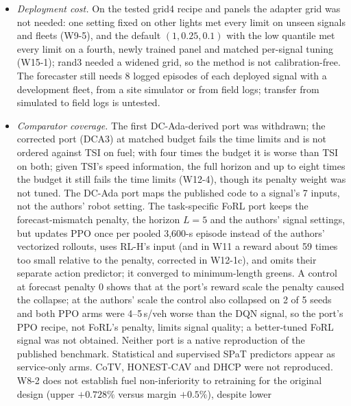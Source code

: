 \begin{itemize}
R15-U lowers it to $-0.09$ (upper $+0.09$) on the same signals and fleets. Field data weigh these dependences unequally: measured fuel
favours PHEMlight5, under which the revision saves, and measured trajectories favour IDM, under which it does not; SUMO's Krauss cars brake
later and harder at a stop than measured drivers, so the Krauss results likely overstate any eco-driving benefit. The fleet's own fixed-time
benefit survives PHEMlight5 ($-4.43\%$). A 1-s minimum delay, implemented by a per-link query cache, removes most of the saving; an exact periodic broadcast with
fixed latency was not modelled.
\item \emph{Deployment cost.} On the tested grid4 recipe and panels the adapter grid was not needed: one setting fixed on other lights met
every limit on unseen signals and fleets (W9-5), and the default $(1,0.25,0.1)$ with the low quantile met every limit on a fourth, newly
trained panel and matched per-signal tuning (W15-1); rand3 needed a widened grid, so the method is not calibration-free. The forecaster still needs 8 logged episodes of each deployed signal with a development fleet, from a site simulator or
from field logs; transfer from simulated to field logs is untested.
\item \emph{Comparator coverage.} The first DC-Ada-derived port was withdrawn; the corrected port (DCA3) at matched budget fails the time limits and is not ordered against TSI on fuel; with four times the budget it is worse than TSI on both; given TSI's speed information, the full horizon and up to eight times the budget it still fails the time limits (W12-4), though its penalty weight was not tuned. The DC-Ada port maps the published code to a signal's 7 inputs, not the authors' robot setting. The task-specific FoRL port keeps the
forecast-mismatch penalty, the horizon $L=5$ and the authors' signal settings, but updates PPO once per pooled 3,600-s episode instead
of the authors' vectorized rollouts, uses RL-H's input (and in W11 a reward about 59 times too small relative to the penalty, corrected in W12-1c), and omits their
separate action predictor; it converged to
minimum-length greens. A control at forecast penalty 0 shows that at the port's reward scale the penalty caused the collapse; at the
authors' scale the control also collapsed on 2 of 5 seeds and both PPO arms were 4--5\,s/veh worse than the DQN signal, so the port's
PPO recipe, not FoRL's penalty, limits signal quality; a better-tuned FoRL signal was not obtained. Neither port is a native reproduction of the published benchmark. Statistical and supervised SPaT predictors appear as service-only arms. CoTV, HONEST-CAV and DHCP were not reproduced. W8-2 does not establish fuel non-inferiority to retraining for the original design (upper $+0.728\%$ versus margin $+0.5\%$), despite lower

\end{itemize}

